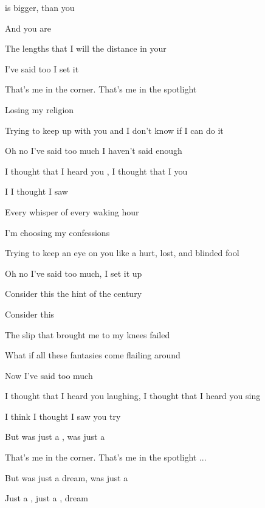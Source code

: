 

\zs
{} is bigger,
 than you

And you are 

The lengths that I will 
the distance in your 

 I've said too 
I set it 
\ks

\zs
That's me in the corner.
That's me in the spotlight

Losing my religion

Trying to keep up with you
and I don't know if I can do it

Oh no I've said too much
I haven't said enough
\ks

\zr
I thought that I heard you ,
I thought that I  you 

I  I thought I saw   
\kr

\zs
Every whisper
of every waking hour

I'm choosing my confessions

Trying to keep an eye on you
like a hurt, lost, and blinded fool

Oh no I've said too much,
I set it up
\ks

\zs
Consider this
the hint of the century

Consider this

The slip that brought me
to my knees failed

What if all these fantasies
come flailing around

Now I've said too much
\ks

\zr
I thought that I heard you laughing,
I thought that I heard you sing

I think I thought I saw you try
\kr

\zr
But  was just a ,
 was just a 
\kr

\zs
That's me in the corner.
That's me in the spotlight ...
\ks

\zr
But  was just a dream,
 was just a 

Just a , just a , dream 
\kr

\kp






















